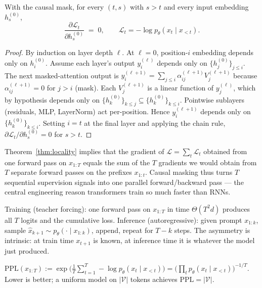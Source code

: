 \begin{theorem}\label{thm:locality}
With the causal mask, for every $(t,s)$ with $s>t$ and every input embedding $h^{(0)}_s$,
\[
  \frac{\partial \mathcal{L}_t}{\partial h^{(0)}_s} \;=\; 0,\qquad \mathcal{L}_t = -\log p_\theta(x_t\mid x_{<t}).
\]
\end{theorem}
\begin{proof}
By induction on layer depth $\ell$. At $\ell=0$, position-$i$ embedding depends only on $h^{(0)}_i$. Assume each layer's output $y^{(\ell)}_i$ depends only on $\{h^{(0)}_j\}_{j\le i}$. The next masked-attention output is
$y^{(\ell+1)}_i = \sum_{j\le i} \alpha^{(\ell+1)}_{ij} V^{(\ell+1)}_j$ because $\alpha^{(\ell+1)}_{ij} = 0$ for $j>i$ (mask). Each $V^{(\ell+1)}_j$ is a linear function of $y^{(\ell)}_j$, which by hypothesis depends only on $\{h^{(0)}_k\}_{k\le j} \subseteq \{h^{(0)}_k\}_{k\le i}$. Pointwise sublayers (residuals, MLP, LayerNorm) act per-position. Hence $y^{(\ell+1)}_i$ depends only on $\{h^{(0)}_k\}_{k\le i}$. Setting $i=t$ at the final layer and applying the chain rule, $\partial \mathcal{L}_t/\partial h^{(0)}_s = 0$ for $s>t$.
\end{proof}

\begin{remark}
Theorem~\ref{thm:locality} implies that the gradient of $\mathcal{L} = \sum_t \mathcal{L}_t$ obtained from one forward pass on $x_{1:T}$ equals the sum of the $T$ gradients we would obtain from $T$ separate forward passes on the prefixes $x_{1:t}$. Causal masking thus turns $T$ sequential supervision signals into one parallel forward/backward pass --- the central engineering reason transformers train so much faster than RNNs.
\end{remark}

\begin{proposition}
Training (teacher forcing): one forward pass on $x_{1:T}$ in time $\Theta(T^2 d)$ produces all $T$ logits and the cumulative loss.
Inference (autoregressive): given prompt $x_{1:k}$, sample $\hat x_{k+1}\sim p_\theta(\cdot\mid x_{1:k})$, append, repeat for $T-k$ steps. The asymmetry is intrinsic: at train time $x_{t+1}$ is known, at inference time it is whatever the model just produced.
\end{proposition}

\begin{definition}[Perplexity]
$\mathrm{PPL}(x_{1:T}) := \exp\!\Big(\frac{1}{T}\sum_{t=1}^T -\log p_\theta(x_t\mid x_{<t})\Big) = \big(\prod_t p_\theta(x_t\mid x_{<t})\big)^{-1/T}$. Lower is better; a uniform model on $|\mathcal{V}|$ tokens achieves $\mathrm{PPL} = |\mathcal{V}|$.
\end{definition}

